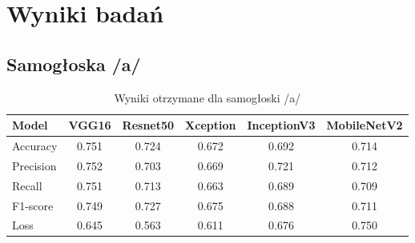 \chapter{Wyniki badań}
\label{ch:wyniki}

\section{Samogłoska /a/}
\label{sec:samogloska-a}


\begin{table}[h]
\centering
\caption{Wyniki otrzymane dla samogłoski /a/}
\label{tab:wyniki-a}
\begin{tabular}{|l|c|c|c|c|c|}
\hline
\textbf{Model} &\textbf{VGG16} &\textbf{Resnet50} &\textbf{Xception} &\textbf{InceptionV3} &\textbf{MobileNetV2} \\ \hline
    Accuracy &0.751 &0.724 &0.672 &0.692 &0.714 \\ \hline
    Precision &0.752 &0.703 &0.669 &0.721 &0.712 \\ \hline
    Recall &0.751 &0.713 &0.663 &0.689 &0.709 \\ \hline
    F1-score &0.749 &0.727 &0.675 &0.688 &0.711 \\ \hline
    Loss &0.645 &0.563 &0.611 &0.676 &0.750 \\ \hline
\end{tabular}
\end{table}


